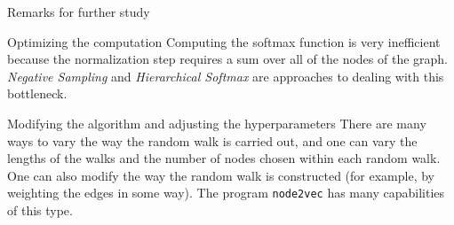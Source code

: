 \documentclass{beamer}
\begin{document}
 \begin{frame}{Remarks for further study}
   \begin{block}{Optimizing the computation}
     Computing the softmax function is very inefficient because the normalization step requires a sum
     over all of the nodes of the graph.  \textit{Negative Sampling} and \textit{Hierarchical Softmax} are approaches to dealing with this bottleneck.
   \end{block}
   \begin{block}{Modifying the algorithm and adjusting the hyperparameters}
     There are many ways to vary the way the random walk is carried out, and one can vary the lengths of the walks and the number of nodes chosen within each random walk.  One can also modify the way the random walk is constructed (for example, by weighting the edges in some way).  The program \texttt{node2vec} has many capabilities of this type.
     \end{block}
\end{frame}    
\end{document}
